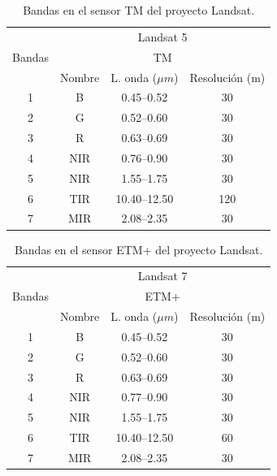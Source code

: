 \begin{table}
	\centering
	\caption[Bandas en el sensor TM]{Bandas en el sensor TM del proyecto Landsat.}
	\begin{tabular}{|c|c|c|c|}
		\hline
		& \multicolumn{3}{|c|}{Landsat 5} \\
		Bandas & \multicolumn{3}{|c|}{TM} \\ 
		\cline{2-4}
		& Nombre & L. onda ($\mu m$) & Resolución (m)\\
		\hline \hline
		1 & B & 0.45--0.52 & 30 \\ \hline
		2 & G & 0.52--0.60 & 30 \\ \hline
		3 & R & 0.63--0.69 & 30 \\ \hline
		4 & NIR & 0.76--0.90 & 30 \\ \hline
		5 & NIR & 1.55--1.75 & 30 \\ \hline
		6 & TIR & 10.40--12.50 & 120 \\ \hline
		7 & MIR & 2.08--2.35 & 30 \\ \hline
	\end{tabular}
	\label{tab:sensoresTM}
\end{table}

\begin{table}
	\centering
	\caption[Bandas en el sensor ETM+]{Bandas en el sensor ETM+ del proyecto Landsat.}
	\begin{tabular}{|c|c|c|c|}
		\hline
		& \multicolumn{3}{|c|}{Landsat 7} \\
		Bandas & \multicolumn{3}{|c|}{ETM+} \\ 
		\cline{2-4}
		& Nombre & L. onda ($\mu m$) & Resolución (m)\\
		\hline \hline
		1 & B & 0.45--0.52 & 30 \\ \hline
		2 & G & 0.52--0.60 & 30 \\ \hline
		3 & R & 0.63--0.69 & 30 \\ \hline
		4 & NIR & 0.77--0.90 & 30 \\ \hline
		5 & NIR & 1.55--1.75 & 30 \\ \hline
		6 & TIR & 10.40--12.50 & 60 \\ \hline
		7 & MIR & 2.08--2.35 & 30 \\ \hline
	\end{tabular}
	\label{tab:sensoresETM}
\end{table}

